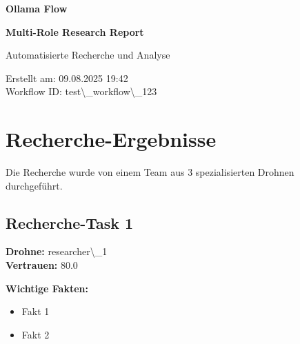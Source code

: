 \documentclass[12pt,a4paper]{article}
\begin{document}
\begin{titlepage}
    \centering
    
    \vspace*{2cm}
    
    {\Huge\bfseries Ollama Flow}
    
    {\Huge\bfseries Multi-Role Research Report}
    
    \vspace{2cm}
    
    {\Large Automatisierte Recherche und Analyse}
    
    \vspace{3cm}
    
    
    \vspace{2cm}
    
    
    \vfill
    
    {\large
    Erstellt am: 09.08.2025 19:42\\
    Workflow ID: test\textbackslash{}_workflow\textbackslash{}_123
    }
    
\end{titlepage}

\newpage
\tableofcontents
\newpage

\section{Recherche-Ergebnisse}

Die Recherche wurde von einem Team aus 3 spezialisierten Drohnen durchgeführt.

\subsection{Recherche-Task 1}

\textbf{Drohne:} researcher\textbackslash{}_1\\
\textbf{Vertrauen:} 80.0%

\textbf{Wichtige Fakten:}
\begin{itemize}
\item Fakt 1
\item Fakt 2
\end{itemize}
\end{document}
